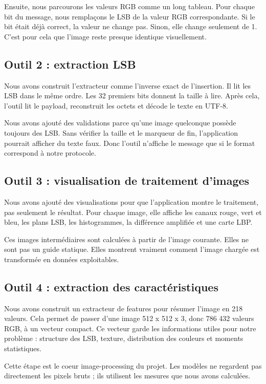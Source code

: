 \documentclass[11pt,a4paper]{article}
\begin{document}
Ensuite, nous parcourons les valeurs RGB comme un long tableau. Pour chaque bit du message, nous remplaçons le LSB de la valeur RGB correspondante. Si le bit était déjà correct, la valeur ne change pas. Sinon, elle change seulement de 1. C'est pour cela que l'image reste presque identique visuellement.

\subsection*{Outil 2 : extraction LSB}
Nous avons construit l'extracteur comme l'inverse exact de l'insertion. Il lit les LSB dans le même ordre. Les 32 premiers bits donnent la taille à lire. Après cela, l'outil lit le payload, reconstruit les octets et décode le texte en UTF-8.

Nous avons ajouté des validations parce qu'une image quelconque possède toujours des LSB. Sans vérifier la taille et le marqueur de fin, l'application pourrait afficher du texte faux. Donc l'outil n'affiche le message que si le format correspond à notre protocole.

\subsection*{Outil 3 : visualisation de traitement d'images}
Nous avons ajouté des visualisations pour que l'application montre le traitement, pas seulement le résultat. Pour chaque image, elle affiche les canaux rouge, vert et bleu, les plans LSB, les histogrammes, la différence amplifiée et une carte LBP.

Ces images intermédiaires sont calculées à partir de l'image courante. Elles ne sont pas un guide statique. Elles montrent vraiment comment l'image chargée est transformée en données exploitables.

\subsection*{Outil 4 : extraction des caractéristiques}
Nous avons construit un extracteur de features pour résumer l'image en 218 valeurs. Cela permet de passer d'une image 512 x 512 x 3, donc 786 432 valeurs RGB, à un vecteur compact. Ce vecteur garde les informations utiles pour notre problème : structure des LSB, texture, distribution des couleurs et moments statistiques.

Cette étape est le coeur image-processing du projet. Les modèles ne regardent pas directement les pixels bruts ; ils utilisent les mesures que nous avons calculées.
\end{document}
